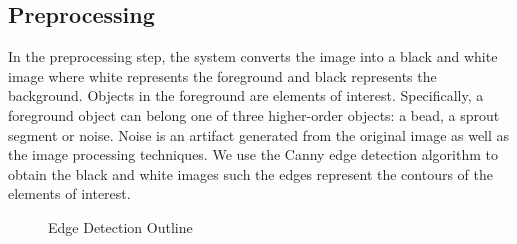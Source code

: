 \documentclass{sig-alternate}
\begin{document}

	\subsection{Preprocessing} %
	\label{sub:Preprocessing}

	In the preprocessing step, the system converts the image into a black
	and white image where white represents the foreground and black
	represents the background. Objects in the foreground are elements of
	interest. Specifically, a foreground object can belong one of three
	higher-order objects: a bead, a sprout segment or noise. Noise is an
	artifact generated from the original image as well as the image
	processing techniques. We use the Canny edge detection algorithm
	\cite{canny86} to obtain the black and white images such the edges
	represent the contours of the elements of interest.
	\begin{figure}[htp!]
		\centering
		\caption{Edge Detection Outline}
		\label{fig:beadex}
	\end{figure}
	
\end{document}
